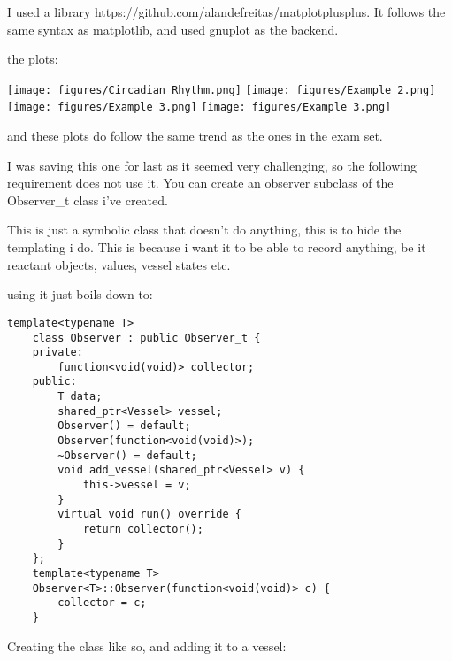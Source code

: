 
I used a library https://github.com/alandefreitas/matplotplusplus. It follows the same syntax as matplotlib, and used gnuplot as the backend.

the plots:

\texttt{[image: figures/Circadian Rhythm.png]}
\texttt{[image: figures/Example 2.png]}
\texttt{[image: figures/Example 3.png]}
\texttt{[image: figures/Example 3.png]}

and these plots do follow the same trend as the ones in the exam set.


I was saving this one for last as it seemed very challenging, so the following requirement does not use it. You can create an observer subclass of the Observer_t class i've created.

This is just a symbolic class that doesn't do anything, this is to hide the templating i do. This is because i want it to be able to record anything, be it reactant objects, values, vessel states etc.

using it just boils down to:

\begin{lstlisting}[style=colorC++]
    template<typename T>
    class Observer : public Observer_t {
    private:
        function<void(void)> collector;
    public:
        T data;
        shared_ptr<Vessel> vessel;
        Observer() = default;
        Observer(function<void(void)>);
        ~Observer() = default;
        void add_vessel(shared_ptr<Vessel> v) {
            this->vessel = v;
        }
        virtual void run() override {
            return collector();
        }
    };
    template<typename T>
    Observer<T>::Observer(function<void(void)> c) {
        collector = c;
    }
\end{lstlisting}

Creating the class like so, and adding it to a vessel:

